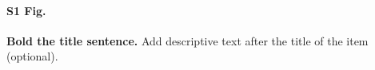 \documentclass[10pt,letterpaper]{article}
\begin{document}
\paragraph*{S1 Fig.}
\label{S1_Fig}
{\bf Bold the title sentence.} Add descriptive text after the title of the item (optional).



\nolinenumbers

%
%
% 


{}





\end{document}
